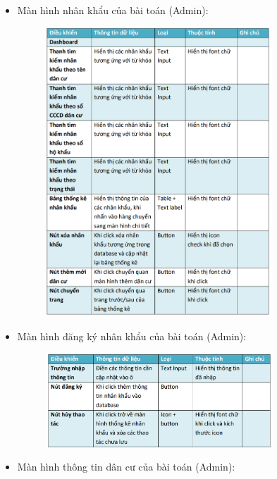 \documentclass{article}
\begin{document}
\begin{itemize}
\begin{figure}[H]
    \end{figure}
    \vspace{5cm}
    \item Màn hình nhân khẩu của bài toán (Admin):
    \begin{figure}[H]
        \centering
        \includegraphics[width=0.8\textwidth]{Ảnh chương 4/Nhân khẩu Admin.png}
    \end{figure}
    \item Màn hình đăng ký nhân khẩu của bài toán (Admin):
    \begin{figure}[H]
        \centering
        \includegraphics[width=0.8\textwidth]{Ảnh chương 4/Thêm nhân khẩu Admin.png}
    \end{figure}
    \vspace{5cm}
    \item Màn hình thông tin dân cư của bài toán (Admin):

\end{itemize}
\end{document}
